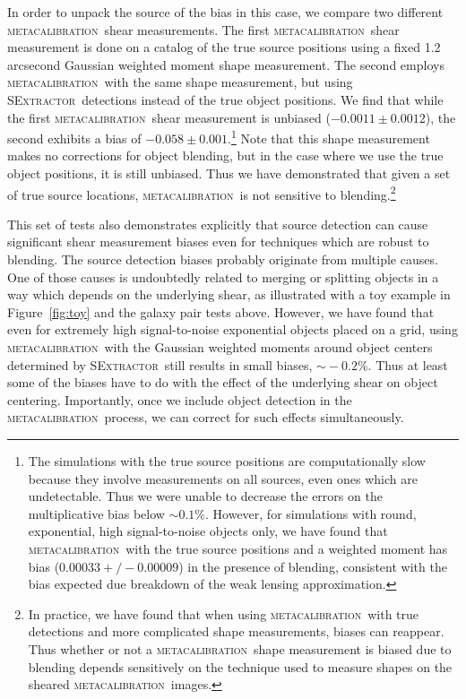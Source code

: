 \documentclass[fleqn,useAMS,usenatbib]{mnras}
\newcommand{\mcal}{\textsc{metacalibration}}
\newcommand{\sx}{\textsc{SExtractor}}
\begin{document}
In order to unpack the source of the bias in this case, we compare two different
\mcal\ shear measurements. The first \mcal\ shear measurement is done on a
catalog of the true source positions using a fixed 1.2 arcsecond Gaussian weighted
moment shape measurement. The second employs \mcal\ with the same shape
measurement, but using \sx\ detections instead of the true object positions. We
find that while the first \mcal\ shear measurement is unbiased
($-0.0011\pm0.0012$), the second exhibits a bias of
$-0.058\pm0.001$.\footnote{The simulations with the true source positions are
computationally slow because they involve measurements on all sources, even ones
which are undetectable. Thus we were unable to decrease the errors on the
multiplicative bias below $\sim0.1\%$. However, for simulations with round,
exponential, high signal-to-noise objects only, we have found that \mcal\ with
the true source positions and a weighted moment has bias
($0.00033 +/- 0.00009$) in the presence of blending, consistent with
the bias expected due breakdown of the weak lensing approximation.} Note that this shape
measurement makes no corrections for object blending, but in the case where we
use the true object positions, it is still unbiased. Thus we have demonstrated
that given a set of true source locations, \mcal\ is not sensitive to
blending.\footnote{In practice, we have found that when using \mcal\ with true
detections and more complicated shape measurements, biases can reappear. Thus
whether or not a \mcal\ shape measurement is biased due to blending depends
sensitively on the technique used to measure shapes on the sheared
\mcal\ images.}

This set of tests also demonstrates explicitly that source detection can cause
significant shear measurement biases even for techniques which are robust to
blending. The source detection biases probably originate from multiple causes.
One of those causes is undoubtedly related to merging or splitting objects in a
way which depends on the underlying shear, as illustrated with a toy example in
Figure~\ref{fig:toy} and the galaxy pair tests above. However, we have found
that even for extremely high signal-to-noise exponential objects placed on a
grid, using \mcal\ with the Gaussian weighted moments around object centers
determined by \sx\ still results in small biases, $\sim\!-0.2\%$. Thus at least
some of the biases have to do with the effect of the underlying shear on object
centering. Importantly, once we include object detection in the \mcal\ process,
we can correct for such effects simultaneously.
\end{document}
